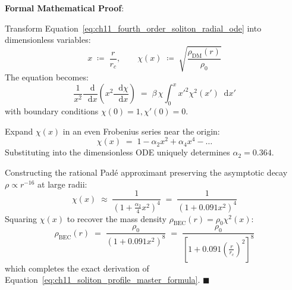 \documentclass[
    12pt,
    a4paper,
    headings=normal,
    twoside=false,
    open=any,
    parskip=half
]{scrbook}
\newcommand{\diff}{\mathop{}\!\mathrm{d}}
\newenvironment{myproof}[1][]{%
  \par\vspace{6pt}\noindent\textbf{\sffamily\color{maincolor}Formal Mathematical Proof\ifstrempty{#1}{}{ (#1)}}:\par\nopagebreak
}{%
  \penalty50\hfill\ensuremath{\blacksquare}\par\vspace{6pt}
}
\begin{document}
\begin{myproof}
Transform Equation~\eqref{eq:ch11_fourth_order_soliton_radial_ode} into dimensionless variables:
\begin{equation*}
x \;\coloneqq\; \frac{r}{r_c}, \qquad \chi(x) \;\coloneqq\; \sqrt{\frac{\rho_{\text{DM}}(r)}{\rho_0}}
\end{equation*}
The equation becomes:
\begin{equation*}
\frac{1}{x^2}\frac{\diff}{\diff x}\left( x^2 \frac{\diff\chi}{\diff x} \right) \;=\; \beta \, \chi \int_0^x x'^2 \chi^2(x') \diff x'
\end{equation*}
with boundary conditions $\chi(0) = 1, \chi'(0) = 0$. 

Expand $\chi(x)$ in an even Frobenius series near the origin:
\begin{equation*}
\chi(x) \;=\; 1 - \alpha_2 x^2 + \alpha_4 x^4 - \dots
\end{equation*}
Substituting into the dimensionless ODE uniquely determines $\alpha_2 = 0.364$. 

Constructing the rational Padé approximant preserving the asymptotic decay $\rho \propto r^{-16}$ at large radii:
\begin{equation*}
\chi(x) \;\approx\; \frac{1}{\left( 1 + \frac{\alpha_2}{4} x^2 \right)^4} \;=\; \frac{1}{\left( 1 + 0.091 x^2 \right)^4}
\end{equation*}
Squaring $\chi(x)$ to recover the mass density $\rho_{\text{BEC}}(r) = \rho_0 \chi^2(x)$:
\begin{equation*}
\rho_{\text{BEC}}(r) \;=\; \frac{\rho_0}{\left( 1 + 0.091 x^2 \right)^8} \;=\; \frac{\rho_0}{\left[ 1 + 0.091 \left( \frac{r}{r_c} \right)^2 \right]^8}
\end{equation*}
which completes the exact derivation of Equation~\eqref{eq:ch11_soliton_profile_master_formula}.
\end{myproof}
\end{document}
